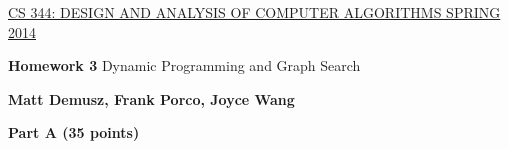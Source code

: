 \documentclass{article}
\begin{document}
\sloppy

\noindent \underline{CS 344: DESIGN AND ANALYSIS OF COMPUTER
  ALGORITHMS \hspace{1.6in} SPRING 2014}

\vspace{0.1in}

\begin{center}
{\bf {\large Homework 3}}
Dynamic Programming and Graph Search
\end{center}

\begin{center}
{\bf Matt Demusz, Frank Porco, Joyce Wang}
\end{center}

\begin{center}
{\bf Part A (35 points)}
\end{center}

\end{document}
